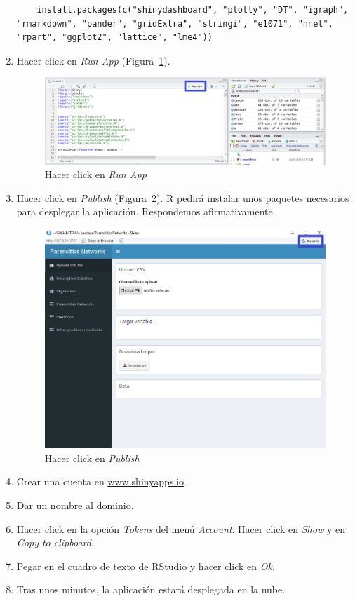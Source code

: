 \begin{enumerate}
	\begin{verbatim}
	install.packages(c("shinydashboard", "plotly", "DT", "igraph", "rmarkdown", "pander", "gridExtra", "stringi", "e1071", "nnet", "rpart", "ggplot2", "lattice", "lme4"))
	\end{verbatim}
	
	\item Hacer click en \textit{Run App} (Figura~\ref{fig:runapp}).
	
	\begin{figure}[htbp!]
		\centering
		\includegraphics[width=0.7\linewidth]{imagenes/runapp}
		\caption{Hacer click en \textit{Run App}}
		\label{fig:runapp}
	\end{figure}
	
	\item Hacer click en \textit{Publish} (Figura~\ref{fig:publish}). R pedirá instalar unos paquetes necesarios para desplegar la aplicación. Respondemos afirmativamente.
	
	\begin{figure}[htbp!]
		\centering
		\includegraphics[width=0.7\linewidth]{imagenes/publish}
		\caption{Hacer click en \textit{Publish}}
		\label{fig:publish}
	\end{figure}
	
	\item Crear una cuenta en \url{www.shinyapps.io}.
	
	\item Dar un nombre al dominio.
	
	\item Hacer click en la opción \textit{Tokens} del menú \textit{Account}. Hacer click en \textit{Show} y en \textit{Copy to clipboard}.
	
	\item Pegar en el cuadro de texto de RStudio y hacer click en \textit{Ok}.
	
	\item Tras unos minutos, la aplicación estará desplegada en la nube.
	
\end{enumerate}